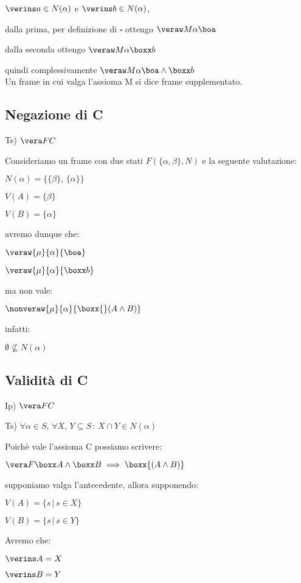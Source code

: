 $\verins a\in N(\alpha)$ e $\verins b\in N(\alpha)$,

dalla prima, per definizione di $\square$ ottengo $\veraw M{\alpha}{\boa}$

dalla seconda ottengo $\veraw M{\alpha}{\boxx b}$ 

quindi complessivamente $\veraw M{\alpha}{\boa\wedge\boxx b}$\\


Un frame in cui valga l'assioma M si dice frame supplementato.


\subsection{Negazione di C}

Ts) $\vera FC$

Consideriamo un frame con due stati $F(\{\alpha,\beta\},N)$ e la
seguente valutazione:

$N(\alpha)=\{\{\beta\},\,\{\alpha\}\}$

$V(A)=\{\beta\}$

$V(B)=\{\alpha\}$

avremo dunque che:

$\veraw{\mu}{\alpha}{\boa}$

$\veraw{\mu}{\alpha}{\boxx b}$

ma non vale:

$\nonveraw{\mu}{\alpha}{\boxx{}(A\wedge B)}$

infatti:

$\emptyset\nsubseteq N(\alpha)$


\subsection{Validità di C}

Ip) $\vera FC$ 

Ts) $\forall\alpha\in S,\,\forall X,\, Y\subseteq S\,:\, X\cap Y\in N(\alpha)$

Poichè vale l'assioma C possiamo scrivere:

$\vera F{\boxx A\wedge\boxx B}\implies\boxx{(A\wedge B)}$

supponiamo valga l'antecedente, allora supponendo:

$V(A)=\{s\,|\, s\in X\}$

$V(B)=\{s\,|\, s\in Y\}$

Avremo che:

$\verins A=X$

$\verins B=Y$

